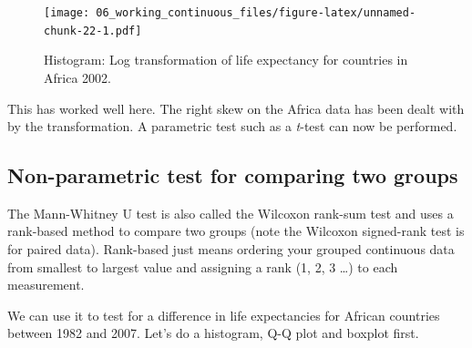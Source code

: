 \documentclass[
  12pt,
  krantz2]{krantz}
\begin{document}
\begin{figure}
\centering
\texttt{[image: 06\_working\_continuous\_files/figure-latex/unnamed-chunk-22-1.pdf]}
\caption{\label{fig:unnamed-chunk-22}Histogram: Log transformation of life expectancy for countries in Africa 2002.}
\end{figure}

This has worked well here.
The right skew on the Africa data has been dealt with by the transformation.
A parametric test such as a \emph{t}-test can now be performed.

\hypertarget{non-parametric-test-for-comparing-two-groups}{%
\subsection{Non-parametric test for comparing two groups}\label{non-parametric-test-for-comparing-two-groups}}


The Mann-Whitney U test is also called the Wilcoxon rank-sum test and uses a rank-based method to compare two groups (note the Wilcoxon signed-rank test is for paired data).
Rank-based just means ordering your grouped continuous data from smallest to largest value and assigning a rank (1, 2, 3 \ldots) to each measurement.

We can use it to test for a difference in life expectancies for African countries between 1982 and 2007.
Let's do a histogram, Q-Q plot and boxplot first.
\end{document}
